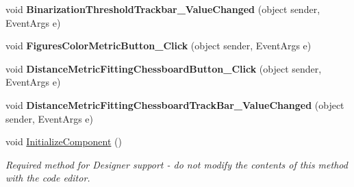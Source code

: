 \begin{DoxyCompactItemize}
void {\bfseries Binarization\+Threshold\+Trackbar\+\_\+\+Value\+Changed} (object sender, Event\+Args e)
\item 
\mbox{\label{class_chess_tracking_1_1_user_interface_1_1_advanced_settings_form_ae5fa8c93d47e3f54da11a4ae5485b339}} 
void {\bfseries Figures\+Color\+Metric\+Button\+\_\+\+Click} (object sender, Event\+Args e)
\item 
\mbox{\label{class_chess_tracking_1_1_user_interface_1_1_advanced_settings_form_a8ad6023aaf3021e728edc4773fbe5702}} 
void {\bfseries Distance\+Metric\+Fitting\+Chessboard\+Button\+\_\+\+Click} (object sender, Event\+Args e)
\item 
\mbox{\label{class_chess_tracking_1_1_user_interface_1_1_advanced_settings_form_a85a644d4ae721eecf8c231ce6ec8b884}} 
void {\bfseries Distance\+Metric\+Fitting\+Chessboard\+Track\+Bar\+\_\+\+Value\+Changed} (object sender, Event\+Args e)
\item 
void \mbox{\hyperlink{class_chess_tracking_1_1_user_interface_1_1_advanced_settings_form_af97e63662ba24b5262a3c90140297020}{Initialize\+Component}} ()
\begin{DoxyCompactList}\small\item\em Required method for Designer support -\/ do not modify the contents of this method with the code editor. \end{DoxyCompactList}\end{DoxyCompactItemize}
